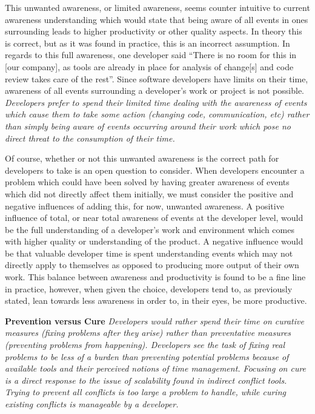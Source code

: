 This unwanted awareness, or limited awareness, seems counter intuitive to current awareness understanding which would state that
being aware of all events in ones surrounding leads to higher productivity or other quality aspects. In theory this is correct,
but as it was found in practice, this is an incorrect assumption. 
In regards to this full awareness, one developer said ``There is no room for this in [our company], as tools are already in place for 
analysis of change[s] and code review takes care of the rest''. Since software developers have limits on their time, awareness of
all events surrounding a developer's work or project is not possible. \textit{Developers prefer to spend their limited time dealing with
the awareness of events which cause them to take some action (changing code, communication, etc) rather than simply being aware
of events occurring around their work which pose no direct threat to the consumption of their time.}

Of course, whether or not this unwanted awareness is the correct path for developers to take is an open question to consider. When
developers encounter a problem which could have been solved by having greater awareness of events which did not directly affect
them initially, we must consider the positive and negative influences of adding this, for now, unwanted awareness. A positive
influence of total, or near total
awareness of events at the developer level, would be the full understanding of a developer's work and environment which comes
with higher quality or understanding of the product. 
A negative influence would be that valuable developer time is spent understanding events which may not directly apply to themselves as opposed to 
producing more output of their own work. This balance between awareness and productivity is found to be a fine line in practice,
however, when given the choice, developers tend to, as previously stated, lean towards less awareness in order to, in their eyes,
be more productive.

\textbf{Prevention versus Cure}  \textit{Developers would rather spend their time on curative measures (fixing problems after they
arise) rather than preventative measures (preventing problems from happening). Developers see the task of fixing real problems
to be less of a burden than preventing potential problems because of available tools and their perceived notions of time management.
Focusing on cure is a direct response to the issue of scalability found in indirect conflict tools. Trying to prevent all conflicts 
is too large a problem to handle, while curing existing conflicts is manageable by a developer.}

